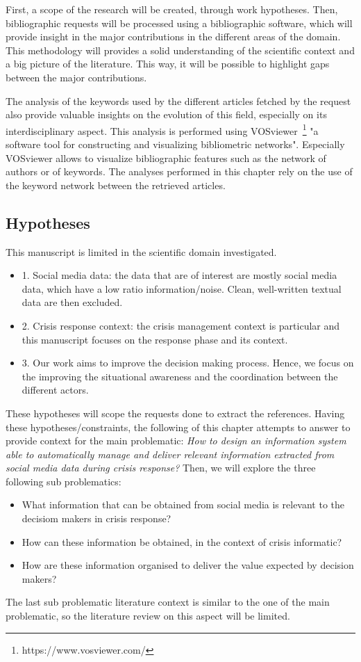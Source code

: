 First, a scope of the research will be created, through work hypotheses.
Then, bibliographic requests will be processed using a bibliographic software, which will provide insight in the major contributions in the different areas of the domain.
This methodology will provides a solid understanding of the scientific context and a big picture of the literature.
This way, it will be possible to highlight gaps between the major contributions.

The analysis of the keywords used by the different articles fetched by the request also provide valuable insights on the evolution of this field, especially on its interdisciplinary aspect.
This analysis is performed using VOSviewer~\footnote{https://www.vosviewer.com/} "a software tool for constructing and visualizing bibliometric networks".
Especially VOSviewer allows to visualize bibliographic features such as the network of authors or of keywords.
The analyses performed in this chapter rely on the use of the keyword network between the retrieved articles.

\subsection{Hypotheses}
This manuscript is limited in the scientific domain investigated.
\begin{itemize}
    \item 1. Social media data: the data that are of interest are mostly social media data, which have a low ratio information/noise. Clean, well-written textual data are then excluded.
    \item 2. Crisis response context: the crisis management context is particular and this manuscript focuses on the response phase and its context.
    \item 3. Our work aims to improve the decision making process. Hence, we focus on the improving the situational awareness and the coordination between the different actors.
\end{itemize}

These hypotheses will scope the requests done to extract the references.
Having these hypotheses/constraints, the following of this chapter attempts to answer to provide context for the main problematic:
\emph{How to design an information system able to automatically manage and deliver relevant information extracted from social media data during crisis response?}
Then, we will explore the three following sub problematics:
\begin{itemize}
    \item What information that can be obtained from social media is relevant to the decisiom makers in crisis response?
    \item How can these information be obtained, in the context of crisis informatic?
    \item How are these information organised to deliver the value expected by decision makers?
\end{itemize}
The last sub problematic literature context is similar to the one of the main problematic, so the literature review on this aspect will be limited.

